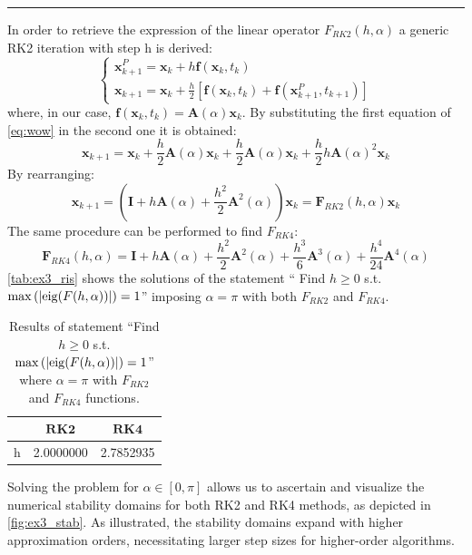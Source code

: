 \documentclass[11pt,a4paper,oneside]{article}
\renewcommand{\vec}[1]{\mathbf{#1}}
\begin{document}
\medskip \hrule \medskip

In order to retrieve the expression of the linear operator $F_{RK2}(h,\alpha)$ a generic RK2 iteration with step h is derived:
\begin{equation}
    \begin{cases}
        \vec{x}_{k+1}^P = \vec{x}_k + h\vec{f}(\vec{x}_k, t_k)\\
        \vec{x}_{k+1} = \vec{x}_k + \frac{h}{2}[\vec{f}(\vec{x}_k,t_k)+\vec{f}(\vec{x}_{k+1}^P, t_{k+1})]
    \end{cases}
    \label{eq:wow}
\end{equation}
where, in our case, $\vec{f}(\vec{x}_k, t_k) = \vec{A}(\alpha)\vec{x}_k$. By substituting the 
first equation of \autoref{eq:wow} in the second one it is obtained:
\begin{equation}
    \vec{x}_{k+1} = \vec{x}_k + \frac{h}{2}\vec{A}(\alpha)\vec{x}_k + \frac{h}{2}\vec{A}(\alpha)\vec{x}_k + \frac{h}{2}h\vec{A}(\alpha)^2\vec{x}_k
\end{equation}
By rearranging:
\begin{equation}
    \vec{x}_{k+1} = (\vec{I} + h\vec{A}(\alpha) + \frac{h^2}{2}\vec{A}^2(\alpha))\vec{x}_k = \vec{F}_{RK2}(h,\alpha)\vec{x}_k
\end{equation}
The same procedure can be performed to find $F_{RK4}$:
\begin{equation}
    \vec{F}_{RK4}(h,\alpha) = \vec{I} + h\vec{A}(\alpha) + \frac{h^2}{2}\vec{A}^2(\alpha) +  \frac{h^3}{6}\vec{A}^3(\alpha) + \frac{h^4}{24}\vec{A}^4(\alpha)
\end{equation}
\autoref{tab:ex3_ris} shows the solutions of the statement ``
Find $h\ge 0$ s.t.$\max\left(|{\rm eig}(F(h,\alpha))|\right) = 1$'' 
imposing $\alpha=\pi$ with both $F_{RK2}$ and $F_{RK4}$.
\begin{table}[h]
    \centering
    \begin{tabular}{l | c c}
         & $\vec{RK2}$ &  $\vec{RK4}$\\
        \midrule \midrule
        h & 2.0000000 & 2.7852935
    \end{tabular}
    \caption{Results of statement ``Find $h\ge 0$ s.t.$\max\left(|{\rm eig}(F(h,\alpha))|\right) = 1$'' where  $\alpha=\pi$ with $F_{RK2}$ and $F_{RK4}$ functions.}
    \label{tab:ex3_ris}
\end{table}

Solving the problem for $\alpha\in[0, \pi]$  allows us to ascertain and visualize the numerical 
stability domains for both RK2 and RK4 methods, as depicted in \autoref{fig:ex3_stab}. 
As illustrated, the stability domains expand with higher approximation orders, 
necessitating larger step sizes for higher-order algorithms.
\end{document}
